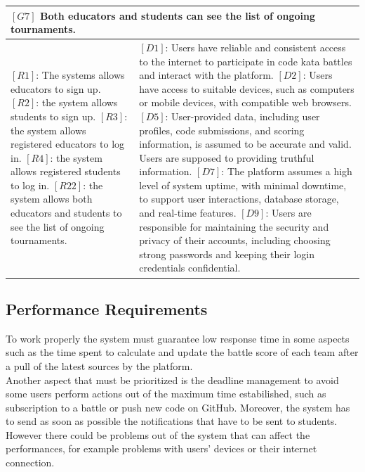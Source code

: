 \begin{table}[H]
\begin{tabular}{|p{8cm}|p{8cm}|}
  \hline
  \multicolumn{2}{|p{16cm}|}{\textbf{$[G7]$ Both educators and students can see the list of ongoing tournaments.}} \\
  \hline
  {
  $[R1]$: The systems allows educators to sign up.
  \newline$[R2]$: the system allows students to sign up.
  \newline$[R3]$: the system allows registered educators to log in.
  \newline$[R4]$: the system allows registered students to log in.
  \newline$[R22]$: the system allows both educators and students to see the list of ongoing tournaments.
  }
  & 
  {
  $[D1]$: Users have reliable and consistent access to the internet to participate in code kata battles and interact with the platform.
  \newline$[D2]$: Users have access to suitable devices, such as computers or mobile devices, with compatible web browsers.
  \newline$[D5]$: User-provided data, including user profiles, code submissions, and scoring information, is assumed to be accurate and valid. Users are supposed to providing truthful information.
  \newline$[D7]$: The platform assumes a high level of system uptime, with minimal downtime, to support user interactions, database storage, and real-time features.
  \newline$[D9]$: Users are responsible for maintaining the security and privacy of their accounts, including choosing strong passwords and keeping their login credentials confidential.
  }
  \\
  \hline
\end{tabular}
\end{table}










\newpage

\subsection{Performance Requirements}

To work properly the system must guarantee low response time in some aspects such as the time spent to calculate and update the battle score of each team after a pull of the latest sources by the platform. \\ Another aspect that must be prioritized is the deadline management to avoid some users perform actions out of the maximum time estabilished, such as subscription to a battle or push new code on GitHub. Moreover, the system has to send as soon as possible the notifications that have to be sent to students. \\However there could be problems out of the system that can affect the performances, for example problems with users' devices or their internet connection.



